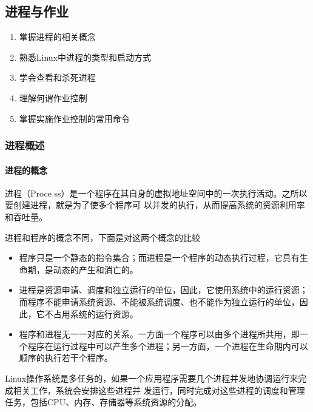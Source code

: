 \documentclass[letterpaper,10pt]{sphinxmanual}
\begin{document}
\subsection{进程与作业}
\label{Linux_pro_mana/process::doc}\label{Linux_pro_mana/process:id1}\begin{enumerate}
\item {} 
掌握进程的相关概念

\item {} 
熟悉Linux中进程的类型和启动方式

\item {} 
学会查看和杀死进程

\item {} 
理解何谓作业控制

\item {} 
掌握实施作业控制的常用命令

\end{enumerate}


\subsubsection{进程概述}
\label{Linux_pro_mana/process:id2}

\paragraph{进程的概念}
\label{Linux_pro_mana/process:id3}
进程（Proce ss）是一个程序在其自身的虚拟地址空间中的一次执行活动。之所以要创建进程，就是为了使多个程序可
以并发的执行，从而提高系统的资源利用率和吞吐量。

进程和程序的概念不同，下面是对这两个概念的比较
\begin{itemize}
\item {} 
程序只是一个静态的指令集合；而进程是一个程序的动态执行过程，它具有生命期，是动态的产生和消亡的。

\item {} 
进程是资源申请、调度和独立运行的单位，因此，它使用系统中的运行资源；而程序不能申请系统资源、不能被系统调度、也不能作为独立运行的单位，因此，它不占用系统的运行资源。

\item {} 
程序和进程无一一对应的关系。一方面一个程序可以由多个进程所共用，即一个程序在运行过程中可以产生多个进程；另一方面，一个进程在生命期内可以顺序的执行若干个程序。

\end{itemize}

Linux操作系统是多任务的，如果一个应用程序需要几个进程并发地协调运行来完成相关工作，系统会安排这些进程并
发运行，同时完成对这些进程的调度和管理任务，包括CPU、内存、存储器等系统资源的分配。
\end{document}
